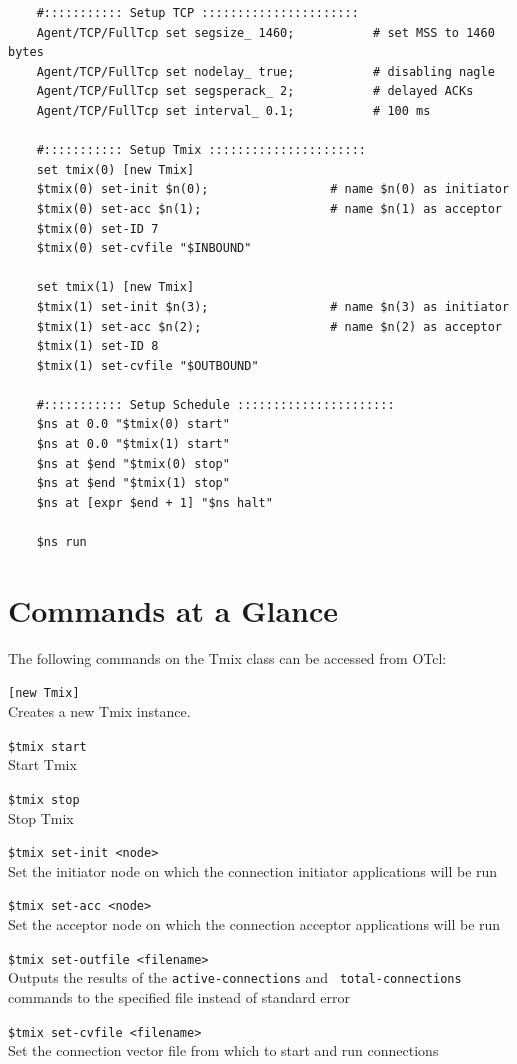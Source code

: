 \begin{verbatim}
	#::::::::::: Setup TCP ::::::::::::::::::::::
	Agent/TCP/FullTcp set segsize_ 1460;           # set MSS to 1460 bytes
	Agent/TCP/FullTcp set nodelay_ true;           # disabling nagle
	Agent/TCP/FullTcp set segsperack_ 2;           # delayed ACKs
	Agent/TCP/FullTcp set interval_ 0.1;           # 100 ms

	#::::::::::: Setup Tmix ::::::::::::::::::::::
	set tmix(0) [new Tmix]
	$tmix(0) set-init $n(0);                 # name $n(0) as initiator
	$tmix(0) set-acc $n(1);                  # name $n(1) as acceptor
	$tmix(0) set-ID 7
	$tmix(0) set-cvfile "$INBOUND"

	set tmix(1) [new Tmix]
	$tmix(1) set-init $n(3);                 # name $n(3) as initiator
	$tmix(1) set-acc $n(2);                  # name $n(2) as acceptor
	$tmix(1) set-ID 8
	$tmix(1) set-cvfile "$OUTBOUND"

	#::::::::::: Setup Schedule ::::::::::::::::::::::
	$ns at 0.0 "$tmix(0) start"
	$ns at 0.0 "$tmix(1) start"
	$ns at $end "$tmix(0) stop"
	$ns at $end "$tmix(1) stop"
	$ns at [expr $end + 1] "$ns halt"

	$ns run
\end{verbatim}

\section{Commands at a Glance}
The following commands on the Tmix class can be accessed from OTcl:

{\tt [new Tmix]}\\
Creates a new Tmix instance.

{\tt \$tmix start}\\
Start Tmix

{\tt \$tmix stop}\\
Stop Tmix

{\tt \$tmix set-init <node>}\\
Set the initiator node on which the connection initiator applications will be run

{\tt \$tmix set-acc <node>}\\
Set the acceptor node on which the connection acceptor applications will be run

{\tt \$tmix set-outfile <filename>}\\
Outputs the results of the {\tt active-connections} and {\tt
  total-connections} commands to the specified file instead of standard error

{\tt \$tmix set-cvfile <filename>}\\
Set the connection vector file from which to start and run connections

